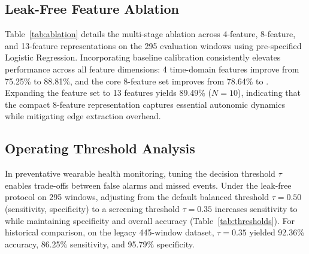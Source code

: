 \documentclass[conference]{IEEEtran}
\begin{document}
\begin{table}[t]
\centering
\caption{Impact of Baseline Calibration Length on Leak-Free Evaluation ($N_{\text{eval}}=295$ Common Windows, 15 Subjects, $\tau = 0.50$)}
\label{tab:calibration_length}

\end{table}

\subsection{Leak-Free Feature Ablation}
Table~\ref{tab:ablation} details the multi-stage ablation across 4-feature, 8-feature, and 13-feature representations on the 295 evaluation windows using pre-specified Logistic Regression. Incorporating baseline calibration consistently elevates performance across all feature dimensions: 4 time-domain features improve from 75.25\% to 88.81\%, and the core 8-feature set improves from 78.64\% to \valNtenAccPct. Expanding the feature set to 13 features yields 89.49\% ($N=10$), indicating that the compact 8-feature representation captures essential autonomic dynamics while mitigating edge extraction overhead.

\begin{table}[t]
\centering
\caption{Leak-Free Model Progression and Feature Ablation ($N_{\text{eval}} = 295$ Windows, $N=10$ Calibration, $\tau=0.50$)}
\label{tab:ablation}

\end{table}

\subsection{Operating Threshold Analysis}
In preventative wearable health monitoring, tuning the decision threshold $\tau$ enables trade-offs between false alarms and missed events. Under the leak-free protocol on 295 windows, adjusting from the default balanced threshold $\tau = 0.50$ (\valNtenSensPct sensitivity, \valNtenSpecPct specificity) to a screening threshold $\tau = 0.35$ increases sensitivity to \valTauThirtyFiveSensPct while maintaining \valTauThirtyFiveSpecPct specificity and \valTauThirtyFiveAccPct overall accuracy (Table~\ref{tab:thresholds}). For historical comparison, on the legacy 445-window dataset, $\tau = 0.35$ yielded 92.36\% accuracy, 86.25\% sensitivity, and 95.79\% specificity.

\begin{table}[t]
\centering
\caption{Decision Threshold Sensitivity Comparison}
\label{tab:thresholds}

\end{table}
\end{document}
